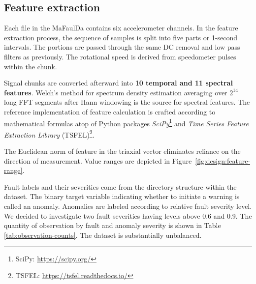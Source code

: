 \subsection{Feature extraction}
Each file in the MaFaulDa contains six accelerometer channels. In the feature extraction process, the sequence of samples is split into five parts or 1-second intervals. The portions are passed through the same DC removal and low pass filters as previously. The rotational speed is derived from speedometer pulses within the chunk.

Signal chunks are converted afterward into \textbf{10 temporal and 11 spectral features}. Welch's method for spectrum density estimation averaging over $2^{14}$ long FFT segments after Hann windowing is the source for spectral features. The reference implementation of feature calculation is crafted according to mathematical formulas atop of Python packages \emph{SciPy}\footnote{SciPy: \url{https://scipy.org/}} and \emph{Time Series Feature Extraction Library} (TSFEL)\footnote{TSFEL: \url{https://tsfel.readthedocs.io/}}.

The Euclidean norm of feature in the triaxial vector eliminates reliance on the direction of measurement. Value ranges are depicted in Figure~\ref{fig:design:feature-range}. 



Fault labels and their severities come from the directory structure within the dataset. The binary target variable indicating whether to initiate a warning is called an anomaly. Anomalies are labeled according to relative fault severity level. We decided to investigate two fault severities having levels above 0.6 and 0.9. The quantity of observation by fault and anomaly severity is shown in Table \ref{tab:observation-counts}. The dataset is substantially unbalanced.


